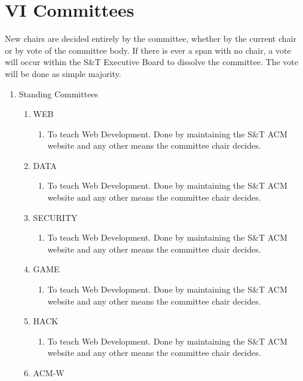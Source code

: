 
\section{VI \textendash{} Committees}
New chairs are decided entirely by the committee, whether by the
current chair or by vote of the committee body. If there is ever a
span with no chair, a vote will occur within the S\&T Executive Board
to dissolve the committee. The vote will be done as simple majority.
\begin{enumerate}[label=\Alph*.]
  \item Standing Committees
    \begin{enumerate}
      \item WEB
        \begin{enumerate}
          \item To teach Web Development. Done by maintaining the S\&T ACM
          website and any other means the committee chair decides.
        \end{enumerate}
      \item DATA
        \begin{enumerate}
          \item To teach Web Development. Done by maintaining the S\&T ACM
          website and any other means the committee chair decides.
        \end{enumerate}
      \item SECURITY
        \begin{enumerate}
          \item To teach Web Development. Done by maintaining the S\&T ACM
          website and any other means the committee chair decides.
        \end{enumerate}
      \item GAME
        \begin{enumerate}
          \item To teach Web Development. Done by maintaining the S\&T ACM
          website and any other means the committee chair decides.
        \end{enumerate}
      \item HACK
        \begin{enumerate}
          \item To teach Web Development. Done by maintaining the S\&T ACM
          website and any other means the committee chair decides.
        \end{enumerate}
      \item ACM-W
        \begin{enumerate}

\end{enumerate}
\end{enumerate}
\end{enumerate}
